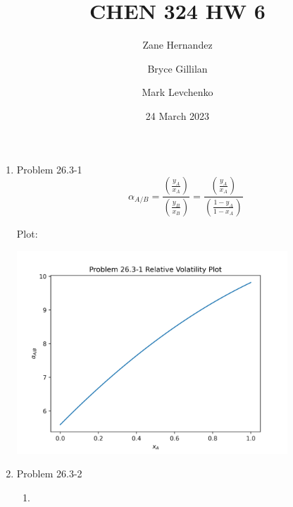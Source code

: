 \documentclass[12pt]{article}
\title{CHEN 324 HW 6}
\author[1]{Zane Hernandez}
\author[2]{Bryce Gillilan}
\author[3]{Mark Levchenko}
\affil[1,2,3]{Group 11}
\date{24 March 2023}
\begin{document}

\begin{enumerate}

\newpage
    \item Problem 26.3-1
    \[
        \alpha_{A/B} = \frac{\left(\frac{y_A}{x_A}\right)}{\left(\frac{y_B}{x_B}\right)} = \frac{\left(\frac{y_A}{x_A}\right)}{\left(\frac{1-y_A}{1-x_A}\right)}   
    \]

    Plot:

    \begin{center}
        \includegraphics[width=0.8\textwidth]{assets/p1.png}
    \end{center}

\newpage
    \item Problem 26.3-2
    
    \begin{enumerate}
        \item 
        

\end{enumerate}
\end{enumerate}
\end{document}
